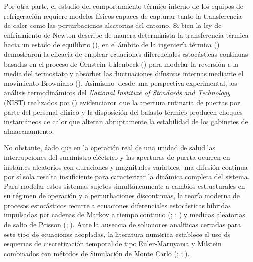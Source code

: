 \documentclass[
  spanish,
  us-letterpaper,
]{scrreprt}
\numberwithin{equation}{section}
\theoremstyle{plain}
\theoremstyle{plain}
\theoremstyle{plain}
\theoremstyle{definition}
\theoremstyle{remark}
\begin{document}
Por otra parte, el estudio del comportamiento térmico interno de los
equipos de refrigeración requiere modelos físicos capaces de capturar
tanto la transferencia de calor como las perturbaciones aleatorias del
entorno. Si bien la ley de enfriamiento de Newton describe de manera
determinista la transferencia térmica hacia un estado de equilibrio
(), en el ámbito de la
ingeniería térmica () demostraron la eficacia de emplear ecuaciones diferenciales
estocásticas continuas basadas en el proceso de Ornstein-Uhlenbeck
() para
modelar la reversión a la media del termostato y absorber las
fluctuaciones difusivas internas mediante el movimiento Browniano
(). Asimismo,
desde una perspectiva experimental, los análisis termodinámicos del
\emph{National Institute of Standards and Technology} (NIST) realizados
por () evidenciaron
que la apertura rutinaria de puertas por parte del personal clínico y la
disposición del balasto térmico producen choques instantáneos de calor
que alteran abruptamente la estabilidad de los gabinetes de
almacenamiento.

No obstante, dado que en la operación real de una unidad de salud las
interrupciones del suministro eléctrico y las aperturas de puerta
ocurren en instantes aleatorios con duraciones y magnitudes variables,
una difusión continua por sí sola resulta insuficiente para caracterizar
la dinámica completa del sistema. Para modelar estos sistemas sujetos
simultáneamente a cambios estructurales en su régimen de operación y a
perturbaciones discontinuas, la teoría moderna de procesos estocásticos
recurre a ecuaciones diferenciales estocásticas híbridas impulsadas por
cadenas de Markov a tiempo continuo
(;
;
) y medidas aleatorias de
salto de Poisson (;
). Ante
la ausencia de soluciones analíticas cerradas para este tipo de
ecuaciones acopladas, la literatura numérica establece el uso de
esquemas de discretización temporal de tipo Euler-Maruyama y Milstein
combinados con métodos de Simulación de Monte Carlo
(;
;
).
\end{document}
